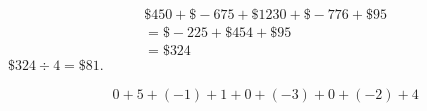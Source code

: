 \documentclass[12pt]{article}
\newenvironment{problem}[2][Problem]{\begin{trivlist}
\item[\hskip \labelsep {\bfseries #1}\hskip \labelsep {\bfseries #2.}]}{\end{trivlist}}
\begin{document}
\begin{problem}{50}
\begin{align*}
    &\$450 + \$-675 + \$1230 + \$-776  + \$95 \\
    &= \$-225 + \$454 + \$95 \\
    &= \$324
\end{align*}
$\$324 \div 4 = \boxed{\$81.}$
\end{problem}

\begin{problem}{51}
\begin{align*}
    &0 + 5 + (-1) + 1 + 0 + (-3) + 0 + (-2) + 4
    
\end{align*}
\end{problem}
\end{document}

